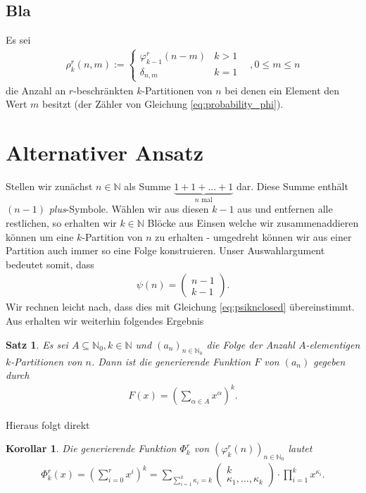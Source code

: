 \documentclass{article}
\newtheorem{theorem}{Satz}
\newtheorem{corollary}{Korollar}
\newcommand{\underbraced}[2]{\ensuremath{\underset{#2}{\underbrace{#1}}}}
\begin{document}
\subsection{Bla}

Es sei \begin{align*}
    \rho_k^r(n,m) := \begin{cases}
        \varphi_{k-1}^r(n-m) & k > 1 \\
        \delta_{n,m}         & k = 1
    \end{cases} ~~~~, 0 \leq m \leq n
\end{align*}
die Anzahl an $r$-beschränkten $k$-Partitionen von $n$ bei denen ein Element den Wert $m$ besitzt (der Zähler von Gleichung \ref{eq:probability_phi}).

\section{Alternativer Ansatz}

Stellen wir zunächst $n \in \mathbb{N}$ als Summe $\underbraced{1 + 1 + ... + 1}{n\text{ mal}}$ dar. Diese Summe enthält $(n-1)$ \emph{plus}-Symbole. Wählen wir aus diesen $k-1$ aus und entfernen alle restlichen, so erhalten wir $k \in \mathbb{N}$ Blöcke aus Einsen welche wir zusammenaddieren können um eine $k$-Partition von $n$ zu erhalten - umgedreht können wir aus einer Partition auch immer so eine Folge konstruieren. Unser Auswahlargument bedeutet somit, dass
\begin{align*}
    \psi(n) = \begin{pmatrix}
        n-1 \\ k-1
    \end{pmatrix}.
\end{align*}
Wir rechnen leicht nach, dass dies mit Gleichung \ref{eq:psiknclosed} übereinstimmt. Aus \cite{wik} erhalten wir weiterhin folgendes Ergebnis

\begin{theorem}\label{theo:wik}
    Es sei $A \subseteq \mathbb{N}_0, k \in \mathbb{N}$ und $(a_n)_{n \in \mathbb{N}_0}$ die Folge der Anzahl $A$-elementigen $k$-Partitionen von $n$. Dann ist die generierende Funktion $F$ von $(a_n)$ gegeben durch
    \begin{align*}
        F(x) = \left(\sum_{\alpha \in A} x^\alpha\right)^k.
    \end{align*}
\end{theorem}

Hieraus folgt direkt

\begin{corollary}
    Die generierende Funktion $\Phi_k^r$ von $(\varphi_k^r(n))_{n \in \mathbb{N}_0}$ lautet
    \begin{align*}
        \Phi_k^r(x) = \left(\sum_{i=0}^r x^i \right)^k = \sum_{\sum_{i=1}^k \kappa_i = k} \begin{pmatrix} k \\ \kappa_1, ..., \kappa_k \end{pmatrix} \cdot \prod_{i=1}^k x^{\kappa_i}.
    \end{align*}
\end{corollary}
\end{document}
